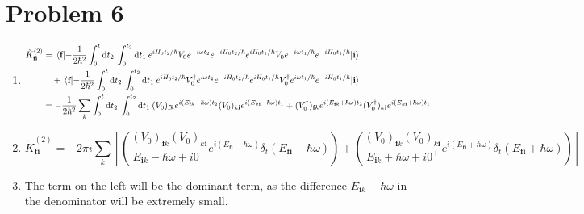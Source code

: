 \documentclass[12pt]{article}
\newcommand{\cint}[2]{\int_{#1}^{#2}}
\newcommand{\cintd}[3]{\cint{#1}{#2}\dd#3\:}
\begin{document}
\section*{Problem 6}
\begin{enumerate}[label=(\alph*)]
    \item 
    \begin{align*}
        \tilde{K}_\textbf{fi}^{(2)} &= \mel{\textbf{f}}{-\frac{1}{2\hbar^2}\cintd{0}{t}{t_2}\cintd{0}{t_2}{t_1}e^{iH_0t_2/\hbar}V_0e^{-i\omega t_2}e^{-iH_0t_2/\hbar}e^{iH_0t_1/\hbar}V_0e^{-i\omega t_1/\hbar}e^{-iH_0t_1/\hbar} }{\textbf{i}} \\
        & \quad + \mel{\textbf{f}}{-\frac{1}{2\hbar^2}\cintd{0}{t}{t_2}\cintd{0}{t_2}{t_1}e^{iH_0t_2/\hbar}V_0^\dag e^{i\omega t_2}e^{-iH_0t_2/\hbar}e^{iH_0t_1/\hbar}V_0^\dag e^{i\omega t_1/\hbar}e^{-iH_0t_1/\hbar} }{\textbf{i}} \\
        &= -\frac{1}{2\hbar^2}\sum_k\cintd{0}{t}{t_2}\cintd{0}{t_2}{t_1}(V_0)_{\textbf{f}k}e^{i(E_{\textbf{f}k}-\hbar\omega)t_2}(V_0)_{k\textbf{i}}e^{i(E_{k\textbf{i}}-\hbar\omega)t_1} + (V_0^\dag)_{\textbf{f}k}e^{i(E_{\textbf{f}k}+\hbar\omega)t_2}(V_0^\dag)_{k\textbf{i}}e^{i(E_{k\textbf{i}}+\hbar\omega)t_1}
    \end{align*}

    \item
    \[ \tilde{K}_\textbf{fi}^{(2)} = -2\pi i \sum_k \left[\left(\frac{(V_0)_{\textbf{f}k}(V_0)_{k\textbf{i}}}{E_{\textbf{i}k}-\hbar\omega +i0^+}e^{i(E_\textbf{fi}-\hbar\omega)}\delta_t(E_\textbf{fi}-\hbar\omega)\right)+\left(\frac{(V_0)_{\textbf{f}k}(V_0)_{k\textbf{i}}}{E_{\textbf{i}k}+\hbar\omega + i0^+}e^{i(E_\textbf{fi}+\hbar\omega)}\delta_t(E_\textbf{fi}+\hbar\omega)\right)\right] \]

    \item
    The term on the left will be the dominant term, as the difference $E_{\mathbf{i}k} - \hbar\omega$ in the denominator will be extremely small.
\end{enumerate}
\end{document}
